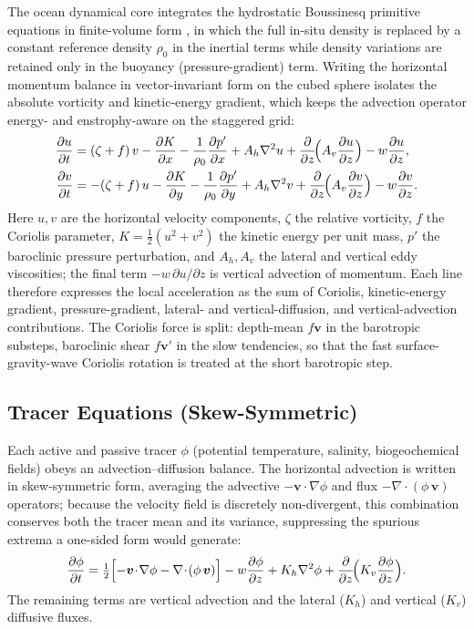\documentclass[11pt,twoside]{report}
\newcommand{\pp}{\partial}
\newcommand{\half}{\tfrac{1}{2}}
\newcommand{\vect}[1]{\bm{#1}}
\newcommand{\grad}{\nabla}
\newcommand{\divg}{\nabla\!\cdot\!}
\begin{document}
The ocean dynamical core integrates the hydrostatic Boussinesq primitive
equations in finite-volume form \citep{Marshall1997}, in which the full
in-situ density is replaced by a constant reference density $\rho_0$ in
the inertial terms while density variations are retained only in the
buoyancy (pressure-gradient) term.  Writing the horizontal momentum
balance in vector-invariant form on the cubed sphere isolates the
absolute vorticity and kinetic-energy gradient, which keeps the
advection operator energy- and enstrophy-aware on the staggered grid:
\begin{align}
  \frac{\pp u}{\pp t} &= (\zeta+f)\,v - \frac{\pp K}{\pp x}
  - \frac{1}{\rho_0}\frac{\pp p'}{\pp x}
  + A_h\nabla^2 u + \frac{\pp}{\pp z}\!\Bigl(A_v\frac{\pp u}{\pp z}\Bigr)
  - w\frac{\pp u}{\pp z}, \\
  \frac{\pp v}{\pp t} &= -(\zeta+f)\,u - \frac{\pp K}{\pp y}
  - \frac{1}{\rho_0}\frac{\pp p'}{\pp y}
  + A_h\nabla^2 v + \frac{\pp}{\pp z}\!\Bigl(A_v\frac{\pp v}{\pp z}\Bigr)
  - w\frac{\pp v}{\pp z}.
\end{align}
Here $u,v$ are the horizontal velocity components, $\zeta$ the relative
vorticity, $f$ the Coriolis parameter, $K=\half(u^2+v^2)$ the kinetic
energy per unit mass, $p'$ the baroclinic pressure perturbation, and
$A_h,A_v$ the lateral and vertical eddy viscosities; the final term
$-w\,\pp u/\pp z$ is vertical advection of momentum.  Each line therefore
expresses the local acceleration as the sum of Coriolis, kinetic-energy
gradient, pressure-gradient, lateral- and vertical-diffusion, and
vertical-advection contributions.  The Coriolis force is split: depth-mean
$f\vect{v}$ in the barotropic substeps, baroclinic shear $f\vect{v}'$ in
the slow tendencies, so that the fast surface-gravity-wave Coriolis
rotation is treated at the short barotropic step.

\subsection{Tracer Equations (Skew-Symmetric)}

Each active and passive tracer $\phi$ (potential temperature, salinity,
biogeochemical fields) obeys an advection--diffusion balance.  The
horizontal advection is written in skew-symmetric form, averaging the
advective $-\vect{v}\!\cdot\!\grad\phi$ and flux $-\divg(\phi\,\vect{v})$
operators; because the velocity field is discretely non-divergent, this
combination conserves both the tracer mean and its variance, suppressing
the spurious extrema a one-sided form would generate:
\begin{equation}
  \frac{\pp\phi}{\pp t} = \half\Bigl[-\vect{v}\!\cdot\!\grad\phi
  - \divg(\phi\,\vect{v})\Bigr]
  - w\frac{\pp\phi}{\pp z}
  + K_h\nabla^2\phi
  + \frac{\pp}{\pp z}\!\Bigl(K_v\frac{\pp\phi}{\pp z}\Bigr).
\end{equation}
The remaining terms are vertical advection and the lateral ($K_h$) and
vertical ($K_v$) diffusive fluxes.
\end{document}
